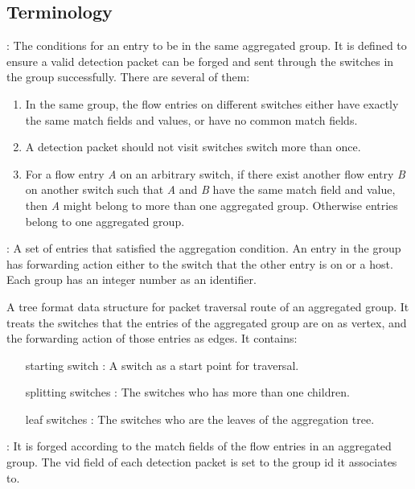 \subsection{Terminology}

\begin{description}%

\item
[Aggregation conditions]:
The conditions for an entry to be in the same aggregated group. It is defined to ensure a valid detection packet can be forged and sent through the switches in the group successfully. There are several of them:
\begin{enumerate}[label={\arabic*)}]
\item
In the same group, the flow entries on different switches either have exactly the same match fields and values, or have no common match fields.
\item
A detection packet should not visit switches switch more than once.
\item
For a flow entry \textit{A} on an arbitrary switch, if there exist another flow entry \textit{B} on another switch such that \textit{A} and \textit{B} have the same match field and value, then \textit{A} might belong to more than one aggregated group. Otherwise entries belong to one aggregated group.

\end{enumerate}


\item
[Aggregated groups]: 
A set of entries that satisfied the aggregation condition. An entry in the group has forwarding action either to the switch that the other entry is on or a host. Each group has an integer number as an identifier.

\item 
[Aggregation tree]
A tree format data structure for packet traversal route of an aggregated group. It treats the switches that the entries of the aggregated group are on as vertex, and the forwarding action of those entries as edges. It contains:
\begin{enumerate}
\item
[starting switch]:
A switch as a start point for traversal.
\item
[splitting switches]:
The switches who has more than one children. 
\item
[leaf switches]:
The switches who are the leaves of the aggregation tree.
\end{enumerate}
\item 

\item
[Detection packets]:
It is forged according to the match fields of the flow entries in an aggregated group. The vid field of each detection packet is set to the group id it associates to.
\end{description}

